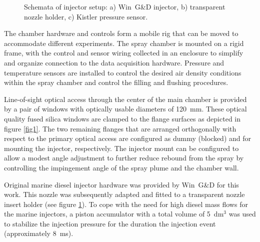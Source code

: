 \documentclass[letterpaper,twocolumn,10pt]{ilass}
\begin{document}
\begin{figure}[h]
\begin{center}
\end{center}
\vspace*{-5mm}
\caption{Schemata of injector setup:
         a) Win~G\&D injector,
				 b) transparent nozzle holder,
				 c) Kistler pressure sensor.}
\label{fig2} 
\end{figure}

The chamber hardware and controls form a mobile rig that can be moved to accommodate
different experiments.
%
The spray chamber is mounted on a rigid frame, with the control and sensor wiring collected
in an enclosure to simplify and organize connection to the data acquisition hardware.
Pressure and temperature sensors are installed to control the desired air density conditions
within the spray chamber and control the filling and flushing procedures.
%

Line-of-sight optical access through the center of the main chamber is provided by a pair
of windows with optically usable diameters of 120~mm. These optical quality fused silica windows are clamped to the flange surfaces as depicted in figure \ref{fig1}.
The two remaining flanges that are arranged orthogonally with respect to the primary
optical access are configured as dummy (blocked) and for mounting the injector, respectively.
%
The injector mount can be configured to allow a modest angle adjustment to further reduce
rebound from the spray by controlling the impingement angle of the spray plume and
the chamber wall.
%

Original marine diesel injector hardware was provided by Win~G\&D for this work.
This nozzle was subsequently adapted and fitted to a transparent nozzle insert holder
(see figure \ref{fig2}).
To cope with the need for high diesel mass flows for the marine injectors,
a piston accumulator with a total volume of 5~dm$^3$ was used to stabilize
the injection pressure for the duration the injection event (approximately 8~ms). 
\end{document}

